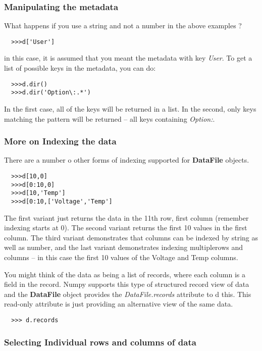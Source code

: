 \documentclass[a4paper,11pt]{scrartcl}
\begin{document}
\subsubsection{Manipulating the metadata}

What happens if you use a string and not a number in the above examples ?
\begin{verbatim}
  >>>d['User']
\end{verbatim}
in this case, it is assumed that you meant the metadata with key \textit{User}. To get a list of possible keys in the metadata, you can do:
\begin{verbatim}
  >>>d.dir()
  >>>d.dir('Option\:.*')
\end{verbatim}
In the first case, all of the keys will be returned in a list. In the second, only keys matching the pattern will be returned -- all keys containing \textit{Option:}.

\subsubsection{More on Indexing the data}

There are a number o other forms of indexing supported for \textbf{DataFile} objects.

\begin{verbatim}
  >>>d[10,0]
  >>>d[0:10,0]
  >>>d[10,'Temp']
  >>>d[0:10,['Voltage','Temp']
\end{verbatim}

The first variant just returns the data in the 11th row, first column (remember indexing starts at 0). The second variant returns the first 10 values in the first column. The third variant demonstrates that columns can be indexed by string as well as number, and the last variant demonstrates indexing multiplerows and columns -- in this case the first 10 values of the Voltage and Temp columns.

You might think of the data as being a list of records, where each column is a field in the record. Numpy supports this type of structured record view of data and the \textbf{DataFile} object provides the \textit{DataFile.records} attribute to d this. This read-only attribute is just providing an alternative view of the same data.

\begin{verbatim}
  >>> d.records
\end{verbatim}

\subsubsection{Selecting Individual rows and columns of data}
\end{document}
